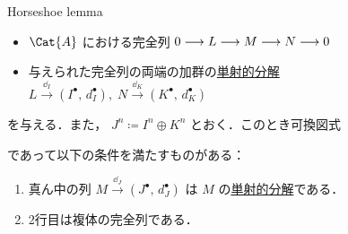 \documentclass[algtopo_main]{subfiles}
\begin{document}
\begin{mylem}[label=lem:RDF-2]{Horseshoe lemma}
    \begin{itemize}
        \item $\Cat{A}$ における完全列 $0 \longrightarrow L \longrightarrow M \longrightarrow N \longrightarrow 0$
        \item 与えられた完全列の両端の加群の\hyperref[def:injective-resolution]{単射的分解} $L \xrightarrow{\dd_I} (I^\bullet,\, d_I^\bullet),\; N \xrightarrow{\dd_K} (K^\bullet,\, d_K^\bullet)$
    \end{itemize}
    を与える．また， $J^n \coloneqq I^n \oplus K^n$ とおく．このとき可換図式
    \begin{center}
    \end{center}
    であって以下の条件を満たすものがある：
    \begin{enumerate}
        \item 真ん中の列 $M \xrightarrow{\dd_J} (J^\bullet,\, d_J^\bullet)$ は $M$ の\hyperref[def:injective-resolution]{単射的分解}である．
        \item 2行目は複体の完全列である．
    \end{enumerate}
    
\end{mylem}
\end{document}
